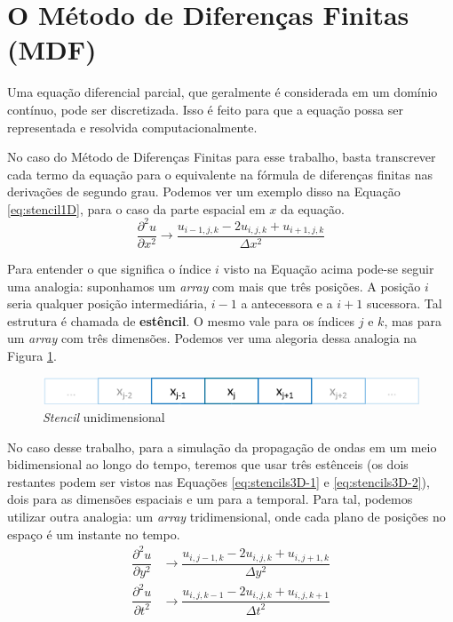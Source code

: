 \section{O Método de Diferenças Finitas (MDF)}

Uma equação diferencial parcial, que geralmente é considerada em um domínio
contínuo, pode ser discretizada. Isso é feito para que a equação possa ser
representada e resolvida computacionalmente.

No caso do Método de Diferenças	Finitas para esse trabalho, basta
transcrever cada termo da equação para o equivalente na fórmula de
diferenças finitas nas derivações de segundo grau. Podemos
ver um exemplo disso na Equação \ref{eq:stencil1D}, para o caso da parte
espacial em $x$ da equação.
\begin{equation}
	\dfrac{\partial^2 u}{\partial x^2} \xrightarrow{} \dfrac{u_{i-1,j,k} -
		2u_{i,j,k} + u_{i+1,j,k}}{\Delta x^2}
	\label{eq:stencil1D}
\end{equation}

Para entender o que
significa o índice $i$ visto na Equação acima pode-se seguir uma analogia:
suponhamos um \textit{array} com mais que três posições. A posição $i$ seria
qualquer posição intermediária, $i-1$ a antecessora e a $i+1$ sucessora. Tal
estrutura é chamada de \textbf{estêncil}. O mesmo vale para os índices
$j$ e $k$, mas para um \textit{array} com três dimensões. Podemos ver
uma alegoria dessa analogia na Figura \ref{fig:stencil1D}.
\begin{figure}[H]
	\label{fig:stencil1D}
	\centering
	\includegraphics[scale=.5, width=\textwidth]{chapters/chp2/images/1d-stencil.png}
	\caption{\textit{Stencil} unidimensional \cite{image:1d-stencil}}
\end{figure}

No caso desse trabalho, para a simulação da propagação de ondas em um
meio bidimensional ao longo do tempo, teremos que usar três estênceis
(os dois restantes podem ser vistos nas Equações
\ref{eq:stencils3D-1} e \ref{eq:stencils3D-2}), dois para as dimensões
espaciais e um para a temporal. Para tal,
podemos utilizar outra analogia: um \textit{array} tridimensional, onde cada
plano de posições no espaço é um instante no tempo.
\begin{align}
	\dfrac{\partial^2 u}{\partial y^2} & \xrightarrow{} \dfrac{u_{i,j-1,k} - 2u_{i,j,k} +
		u_{i,j+1,k}}{\Delta y^2}
	\label{eq:stencils3D-1}
	\\
	\dfrac{\partial^2 u}{\partial t^2} & \xrightarrow{} \dfrac{u_{i,j,k-1} - 2u_{i,j,k} +
		u_{i,j,k+1}}{\Delta t^2}
	\label{eq:stencils3D-2}
\end{align}

